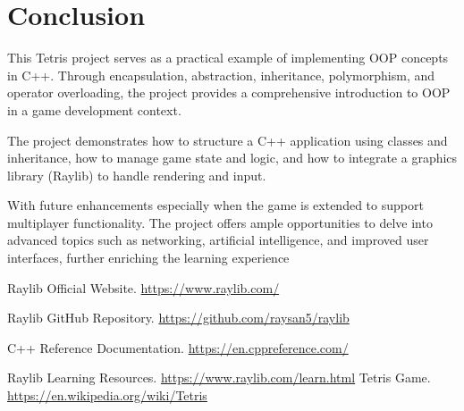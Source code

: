 \documentclass{article}
\begin{document}
\section{Conclusion}

This Tetris project serves as a practical example of implementing OOP concepts in C++. Through encapsulation, abstraction, inheritance, polymorphism, and operator overloading, the project provides a comprehensive introduction to OOP in a game development context.

The project demonstrates how to structure a C++ application using classes and inheritance, how to manage game state and logic, and how to integrate a graphics library (Raylib) to handle rendering and input.

With future enhancements especially when the game is extended to support multiplayer functionality. The project offers ample opportunities to delve into advanced topics such as networking, artificial intelligence, and improved user interfaces, further enriching the learning experience
\newpage
\begin{thebibliography}{9}

Raylib Official Website. \url{https://www.raylib.com/}

Raylib GitHub Repository. \url{https://github.com/raysan5/raylib}

C++ Reference Documentation. \url{https://en.cppreference.com/}

Raylib Learning Resources. \url{https://www.raylib.com/learn.html}
Tetris Game. \url{https://en.wikipedia.org/wiki/Tetris}
\end{thebibliography}
\end{document}
